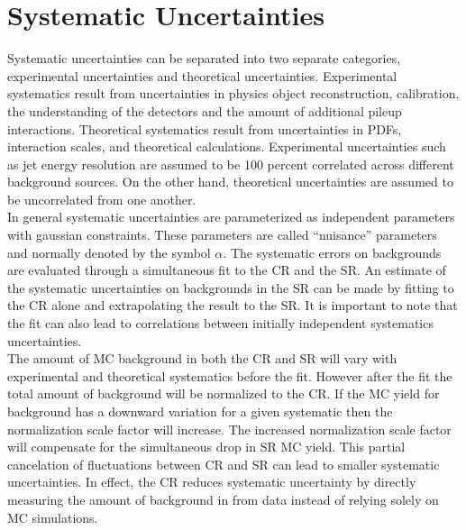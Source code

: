 
\chapter{Systematic Uncertainties}
\label{chap:Uncertainties}

\indent Systematic uncertainties can be separated into two separate categories, experimental uncertainties and theoretical uncertainties.  Experimental systematics result from uncertainties in physics object reconstruction, calibration, the understanding of the detectors and the amount of additional pileup interactions.  Theoretical systematics result from uncertainties in PDFs, interaction scales, and theoretical calculations. Experimental uncertainties such as jet energy resolution are assumed to be 100 percent correlated across different background sources.  On the other hand, theoretical uncertainties are assumed to be uncorrelated from one another.  \\

\indent In general systematic uncertainties are parameterized as independent parameters with gaussian constraints.  These parameters are called ``nuisance'' parameters and normally denoted by the symbol $\alpha$.  The systematic errors on backgrounds are evaluated through a simultaneous fit to the CR and the SR.  An estimate of the systematic uncertainties on backgrounds in the SR can be made by fitting to the CR alone and extrapolating the result to the SR.  It is important to note that the fit can also lead to correlations between initially independent systematics uncertainties. \\

\indent The amount of MC background in both the CR and SR will vary with experimental and theoretical systematics before the fit.  However after the fit the total amount of background will be normalized to the CR.  If the MC yield for background has a downward variation for a given systematic then the normalization scale factor will increase.  The increased normalization scale factor will compensate for the simultaneous drop in SR MC yield.  This partial cancelation of fluctuations between CR and SR can lead to smaller systematic uncertainties.  In effect, the CR reduces systematic uncertainty by directly measuring the amount of background in from data instead of relying solely on MC simulations.\\


